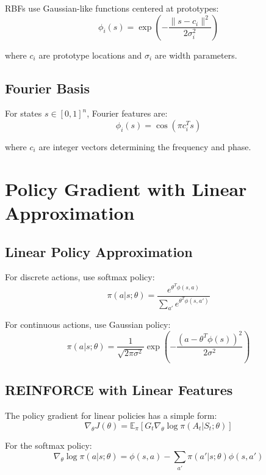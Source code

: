 RBFs use Gaussian-like functions centered at prototypes:
\begin{equation}
\phi_i(s) = \exp\left(-\frac{\|s - c_i\|^2}{2\sigma_i^2}\right)
\end{equation}

where $c_i$ are prototype locations and $\sigma_i$ are width parameters.

\subsection{Fourier Basis}

For states $s \in [0,1]^n$, Fourier features are:
\begin{equation}
\phi_i(s) = \cos(\pi c_i^T s)
\end{equation}

where $c_i$ are integer vectors determining the frequency and phase.

\section{Policy Gradient with Linear Approximation}

\subsection{Linear Policy Approximation}

For discrete actions, use softmax policy:
\begin{equation}
\pi(a|s; \theta) = \frac{e^{\theta^T \phi(s,a)}}{\sum_{a'} e^{\theta^T \phi(s,a')}}
\end{equation}

For continuous actions, use Gaussian policy:
\begin{equation}
\pi(a|s; \theta) = \frac{1}{\sqrt{2\pi\sigma^2}} \exp\left(-\frac{(a - \theta^T \phi(s))^2}{2\sigma^2}\right)
\end{equation}

\subsection{REINFORCE with Linear Features}

The policy gradient for linear policies has a simple form:
\begin{equation}
\nabla_\theta J(\theta) = \mathbb{E}_\pi \left[ G_t \nabla_\theta \log \pi(A_t|S_t; \theta) \right]
\end{equation}

For the softmax policy:
\begin{equation}
\nabla_\theta \log \pi(a|s; \theta) = \phi(s,a) - \sum_{a'} \pi(a'|s; \theta) \phi(s,a')
\end{equation}


